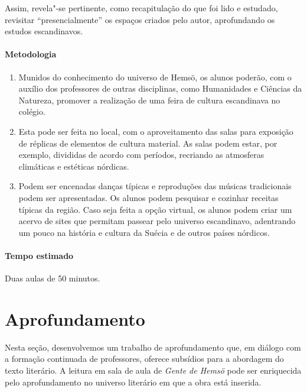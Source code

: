 \documentclass[12pt]{extarticle}
\begin{document}
Assim, revela"-se pertinente, como recapitulação do que foi lido e 
estudado, revisitar ``presencialmente'' os espaços 
criados pelo autor, aprofundando os estudos escandinavos. 

\paragraph{Metodologia}

\begin{enumerate}

\item
Munidos do conhecimento do universo de Hemsö, os alunos
poderão, com o auxílio dos professores de outras disciplinas, 
como Humanidades e Ciências da Natureza, 
promover a realização de uma feira de cultura escandinava no colégio. 

\item
Esta pode ser feita no local, com o aproveitamento das salas para exposição 
de réplicas de elementos de cultura material. As salas podem estar, por 
exemplo, divididas de acordo com períodos, recriando as atmosferas 
climáticas e estéticas nórdicas.

\item
Podem ser encenadas danças típicas e reproduções das músicas tradicionais 
podem ser apresentadas. Os alunos podem pesquisar e cozinhar receitas 
típicas da região. Caso seja feita a opção virtual, os alunos podem criar 
um acervo de sites que permitam passear pelo universo escandinavo, 
adentrando um pouco na história e cultura da Suécia e de outros países 
nórdicos.

\end{enumerate}

\paragraph{Tempo estimado} Duas aulas de 50 minutos.


\section{Aprofundamento}

Nesta seção, desenvolvemos um trabalho de aprofundamento que, em diálogo
com a formação continuada de professores, oferece subsídios para a
abordagem do texto literário. A leitura em sala de aula de \emph{Gente
de Hemsö} pode ser enriquecida pelo aprofundamento no universo literário
em que a obra está inserida.
\end{document}

